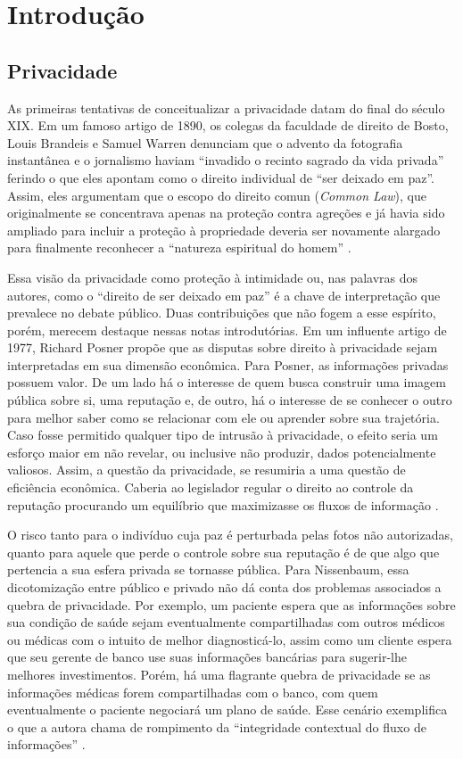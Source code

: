 \chapter{Introdução}

\section{Privacidade}
\label{sec:privacidade}

As primeiras tentativas de conceitualizar a privacidade datam do final do século XIX.
Em um famoso artigo de 1890, os colegas da faculdade de direito de Bosto, Louis Brandeis e Samuel Warren denunciam que o advento da fotografia instantânea e o jornalismo haviam ``invadido o recinto sagrado da vida privada'' ferindo o que eles apontam como o direito individual de ``ser deixado em paz''.
Assim, eles argumentam que o escopo do direito comun ({\em Common Law}), que originalmente se concentrava apenas na proteção contra agreções e já havia sido ampliado para incluir a proteção à propriedade deveria ser novamente alargado para finalmente reconhecer a ``natureza espiritual do homem'' \cite{}.

Essa visão da privacidade como proteção à intimidade ou, nas palavras dos autores, como o ``direito de ser deixado em paz'' é a chave de interpretação que prevalece no debate público.
Duas contribuições que não fogem a esse espírito, porém, merecem destaque nessas notas introdutórias.
Em um influente artigo de 1977, Richard Posner propõe que as disputas sobre direito à privacidade sejam interpretadas em sua dimensão econômica.
Para Posner, as informações privadas possuem valor. 
De um lado há o interesse de quem busca construir uma imagem pública sobre si, uma reputação e, de outro, há o interesse de se conhecer o outro para melhor saber como se relacionar com ele ou aprender sobre sua trajetória.
Caso fosse permitido qualquer tipo de intrusão à privacidade, o efeito seria um esforço maior em não revelar, ou inclusive não produzir, dados potencialmente valiosos.
Assim, a questão da privacidade, se resumiria a uma questão de eficiência econômica.
Caberia ao legislador regular o direito ao controle da reputação procurando um equilíbrio que maximizasse os fluxos de informação \cite{}. 

O risco tanto para o indivíduo cuja paz é  perturbada pelas fotos não autorizadas, quanto para aquele que perde o controle sobre sua reputação é de que algo que pertencia a sua esfera privada se tornasse pública.
Para Nissenbaum, essa dicotomização entre público e privado não dá conta dos problemas associados a quebra de privacidade.
Por exemplo, um paciente espera que as informações sobre sua condição de saúde sejam eventualmente compartilhadas com outros médicos ou médicas com o intuito de melhor diagnosticá-lo, assim como um cliente espera que seu gerente de banco use suas informações bancárias para sugerir-lhe melhores investimentos.
Porém, há uma flagrante quebra de privacidade se as informações médicas forem compartilhadas com o banco, com quem eventualmente o paciente negociará um plano de saúde.
Esse cenário exemplifica o que a autora chama de rompimento da ``integridade contextual do fluxo de informações'' \cite{}.

